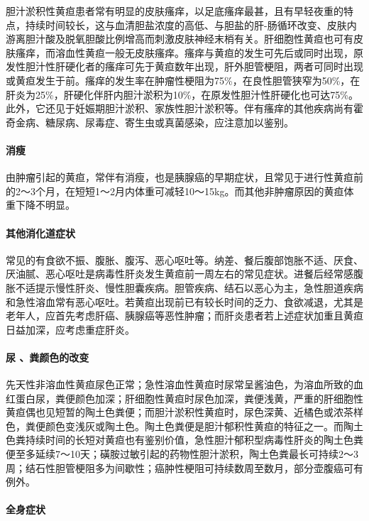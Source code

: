 胆汁淤积性黄疸患者常有明显的皮肤瘙痒，以足底瘙痒最甚，且有早轻夜重的特点，持续时间较长，这与血清胆盐浓度的高低、与胆盐的肝-肠循环改变、皮肤内游离胆汁酸及脱氧胆酸比例增高而刺激皮肤神经末梢有关。肝细胞性黄疸也可有皮肤瘙痒，而溶血性黄疸一般无皮肤瘙痒。瘙痒与黄疸的发生可先后或同时出现，原发性胆汁性肝硬化者的瘙痒可先于黄疸数年出现，肝外胆管梗阻，两者可同时出现或黄疸发生于前。瘙痒的发生率在肿瘤性梗阻为75\%，在良性胆管狭窄为50\%，在肝炎为25\%，肝硬化伴肝内胆汁淤积为10\%，在原发性胆汁性肝硬化也可达75\%。此外，它还见于妊娠期胆汁淤积、家族性胆汁淤积等。伴有瘙痒的其他疾病尚有霍奇金病、糖尿病、尿毒症、寄生虫或真菌感染，应注意加以鉴别。

\paragraph{消瘦}

由肿瘤引起的黄疸，常伴有消瘦，也是胰腺癌的早期症状，且常见于进行性黄疸前的2～3个月，在短短1～2月内体重可减轻10～15kg。而其他非肿瘤原因的黄疸体重下降不明显。

\paragraph{其他消化道症状}

常见的有食欲不振、腹胀、腹泻、恶心呕吐等。纳差、餐后腹部饱胀不适、厌食、厌油腻、恶心呕吐是病毒性肝炎发生黄疸前一周左右的常见症状。进餐后经常感腹胀不适提示慢性肝炎、慢性胆囊疾病。胆管疾病、结石以恶心为主，急性胆道疾病和急性溶血常有恶心呕吐。若黄疸出现前已有较长时间的乏力、食欲减退，尤其是老年人，应首先考虑肝癌、胰腺癌等恶性肿瘤；而肝炎患者若上述症状加重且黄疸日益加深，应考虑重症肝炎。

\paragraph{尿 、粪颜色的改变}

先天性非溶血性黄疸尿色正常；急性溶血性黄疸时尿常呈酱油色，为溶血所致的血红蛋白尿，粪便颜色加深；肝细胞性黄疸时尿色加深，粪便浅黄，严重的肝细胞性黄疸偶也见短暂的陶土色粪便；而胆汁淤积性黄疸时，尿色深黄、近橘色或浓茶样色，粪便颜色变浅灰或陶土色。陶土色粪便是胆汁郁积性黄疸的特征之一。而陶土色粪持续时间的长短对黄疸也有鉴别价值，急性胆汁郁积型病毒性肝炎的陶土色粪便至多延续7～10天；磺胺过敏引起的药物性胆汁淤积，陶土色粪最长可持续2～3周；结石性胆管梗阻多为间歇性；癌肿性梗阻可持续数周至数月，部分壶腹癌可有例外。

\paragraph{全身症状}

